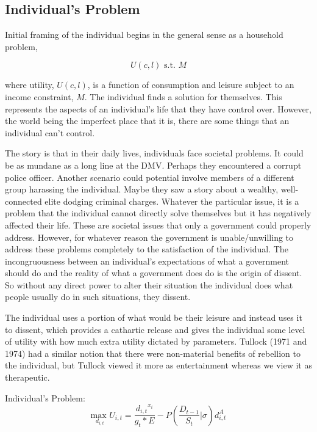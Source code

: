 \documentclass[12pt]{article}
\begin{document}
\begin{spacing}{1.5}
\subsection{Individual's Problem}
Initial framing of the individual begins in the general sense as a household problem, 

\begin{equation}
	U(c,l) \text{ s.t. } M
\end{equation}

\noindent where utility, $U(c,l)$, is a function of consumption and leisure subject to an income constraint, $M$. The individual finds a solution for themselves. This represents the aspects of an individual's life that they have control over. However, the world being the imperfect place that it is, there are some things that an individual can't control.  

The story is that in their daily lives, individuals face societal problems. It could be as mundane as a long line at the DMV. Perhaps they encountered a corrupt police officer. Another scenario could potential involve members of a different group harassing the individual. Maybe they saw a story about a wealthy, well-connected elite dodging criminal charges. Whatever the particular issue, it is a problem that the individual cannot directly solve themselves but it has negatively affected their life. These are societal issues that only a government could properly address. However, for whatever reason the government is unable/unwilling to address these problems completely to the satisfaction of the individual. The incongruousness between an individual's expectations of what a government should do and the reality of what a government does do is the origin of dissent. So without any direct power to alter their situation the individual does what people usually do in such situations, they dissent. 

The individual uses a portion of what would be their leisure and instead uses it to dissent, which provides a cathartic release and gives the individual some level of utility with how much extra utility dictated by parameters. Tullock (1971 and 1974) had a similar notion that there were non-material benefits of rebellion to the individual, but Tullock viewed it more as entertainment whereas we view it as therapeutic.  

\vspace{.5 em}
\noindent Individual's Problem:
\begin{equation}
{\underset{d_{i,t}}{\text{max }}}  U_{i,t}= \frac{{d_{i,t}}^{{x}_i}}{g_t * E} - P \left(\frac{D_{t-1}}{S_t}\Bigg|\sigma \right)d_{i,t}^A
\end{equation}


\end{spacing}
\end{document}
